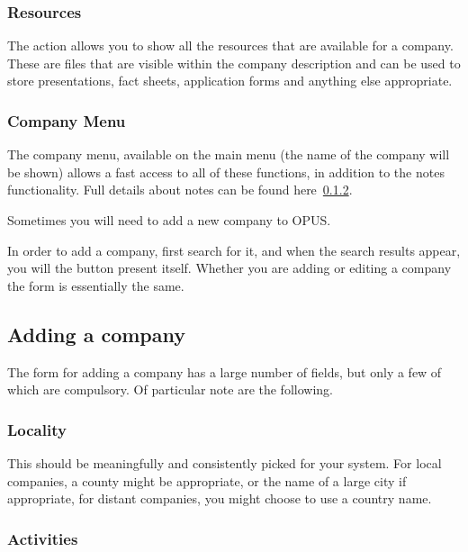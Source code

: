 \documentclass[12 pt]{book}
\begin{document}
\subsubsection{Resources}

The  action allows you to show all the resources that are
available for a company. These are files that are visible within the company
description and can be used to store presentations, fact sheets, application
forms and anything else appropriate.

\subsubsection{Company Menu}

The company menu, available on the main menu (the name of the company will be
shown) allows a fast access to all of these functions, in addition to the notes
functionality. Full details about notes can be found here~\ref{}.

Sometimes you will need to add a new company to OPUS.


In order to add a company, first search for it, and when the search results
appear, you will the  button present itself. Whether you are 
adding or editing a company the form is essentially the same.

\subsection{Adding a company}

The form for adding a company has a large number of fields, but only a few of
which are compulsory. Of particular note are the following.

\subsubsection{Locality}

This should be meaningfully and consistently picked for your system. For
local companies, a county might be appropriate, or the name of a large city
if appropriate, for distant companies, you might choose to use a country name.

\subsubsection{Activities}
\end{document}
